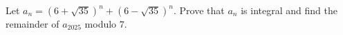 Let $a_n=(6+\sqrt{35})^n+(6-\sqrt{35})^n$. Prove that $a_n$ is integral and find the remainder of $a_{2025}$ modulo $7$.
